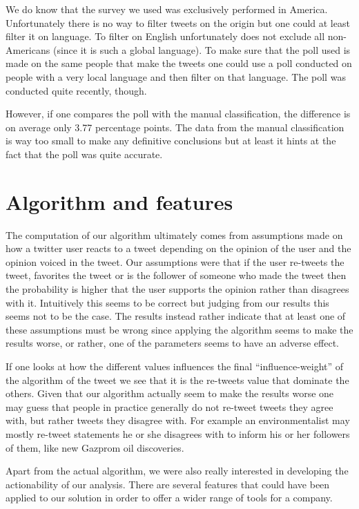 \documentclass[a4paper,12pt]{report}
\begin{document}
We do know that the survey we used was exclusively performed in America. Unfortunately there is no way to filter tweets on the origin but one could at least filter it on language. To filter on English unfortunately does not exclude all non-Americans (since it is such a global language). To make sure that the poll used is made on the same people that make the tweets one could use a poll conducted on people with a very local language and then filter on that language. The poll was conducted quite recently, though.

However, if one compares the poll with the manual classification, the difference is on average only 3.77 percentage points. The data from the manual classification is way too small to make any definitive conclusions but at least it hints at the fact that the poll was quite accurate.

\section{Algorithm and features}

The computation of our algorithm ultimately comes from assumptions made on how a twitter user reacts to a tweet depending on the opinion of the user and the opinion voiced in the tweet. Our assumptions were that if the user re-tweets the tweet, favorites the tweet or is the follower of someone who made the tweet then the probability is higher that the user supports the opinion rather than disagrees with it. Intuitively this seems to be correct but judging from our results this seems not to be the case. The results instead rather indicate that at least one of these assumptions must be wrong since applying the algorithm seems to make the results worse, or rather, one of the parameters seems to have an adverse effect. 

If one looks at how the different values influences the final ``influence-weight'' of the algorithm of the tweet we see that it is the re-tweets value that dominate the others. Given that our algorithm actually seem to make the results worse one may guess that people in practice generally do not re-tweet tweets they agree with, but rather tweets they disagree with. For example an environmentalist may mostly re-tweet statements he or she disagrees with to inform his or her followers of them, like new Gazprom oil discoveries.

Apart from the actual algorithm, we were also really interested in developing the actionability of our analysis. There are several features that could have been applied to our solution in order to offer a wider range of tools for a company.
\end{document}

